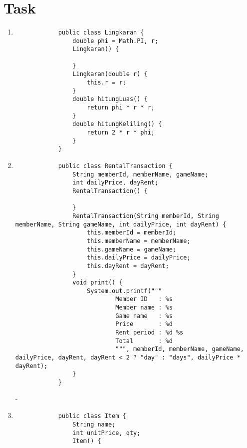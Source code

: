 \documentclass[12pt,titlepage]{article}
\begin{document}
\newpage

\section{Task}

\begin{enumerate}
    \item 
    {
        \begin{verbatim}
            public class Lingkaran {
                double phi = Math.PI, r;
                Lingkaran() {

                }
                Lingkaran(double r) {
                    this.r = r;
                }
                double hitungLuas() {
                    return phi * r * r;
                }
                double hitungKeliling() {
                    return 2 * r * phi;
                }
            }
        \end{verbatim}
    }
    \item \mbox{}
    {
        \begin{verbatim}
            public class RentalTransaction {
                String memberId, memberName, gameName;
                int dailyPrice, dayRent;
                RentalTransaction() {

                }
                RentalTransaction(String memberId, String memberName, String gameName, int dailyPrice, int dayRent) {
                    this.memberId = memberId;
                    this.memberName = memberName;
                    this.gameName = gameName;
                    this.dailyPrice = dailyPrice;
                    this.dayRent = dayRent;
                }
                void print() {
                    System.out.printf("""
                            Member ID   : %s
                            Member name : %s
                            Game name   : %s
                            Price       : %d
                            Rent period : %d %s
                            Total       : %d
                            """, memberId, memberName, gameName, dailyPrice, dayRent, dayRent < 2 ? "day" : "days", dailyPrice * dayRent);
                }
            }
        \end{verbatim}
        -

    }
    \item 
    {
        \begin{verbatim}
            public class Item {
                String name;
                int unitPrice, qty;
                Item() {


\end{verbatim}}
\end{enumerate}
\end{document}
